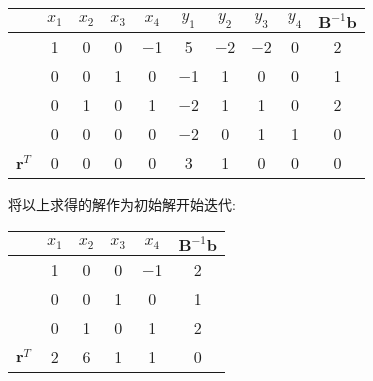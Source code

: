 \documentclass[UTF8]{ctexart}
\begin{document}
\begin{enumerate}
          \begin{table}[ht]
              \centering
              \begin{tabular}{cccccccccc}
                  \toprule
                  {}         & $x_1$ & $x_2$ & $x_3$ & $x_4$ & $y_1$ & $y_2$ & $y_3$ & $y_4$ & $\bm{B}^{-1}\bm{b}$ \\
                  \midrule
                  {}         & 1     & 0     & 0     & −1    & 5     & −2    & −2    & 0     & 2                   \\
                  {}         & 0     & 0     & 1     & 0     & −1    & 1     & 0     & 0     & 1                   \\
                  {}         & 0     & 1     & 0     & 1     & −2    & 1     & 1     & 0     & 2                   \\
                  {}         & 0     & 0     & 0     & 0     & −2    & 0     & 1     & 1     & 0                   \\
                  $\bm{r}^T$ & 0     & 0     & 0     & 0     & 3     & 1     & 0     & 0     & 0                   \\
                  \bottomrule
              \end{tabular}
          \end{table}

          \clearpage
          将以上求得的解作为初始解开始迭代:

          \begin{table}[ht]
              \centering
              \begin{tabular}{cccccc}
                  \toprule
                  {}         & $x_1$ & $x_2$ & $x_3$ & $x_4$ & $\bm{B}^{-1}\bm{b}$ \\
                  \midrule
                  {}         & 1     & 0     & 0     & −1    & 2                   \\
                  {}         & 0     & 0     & 1     & 0     & 1                   \\
                  {}         & 0     & 1     & 0     & 1     & 2                   \\
                  $\bm{r}^T$ & 2     & 6     & 1     & 1     & 0                   \\
                  \bottomrule
              \end{tabular}
          \end{table}


\end{enumerate}
\end{document}
